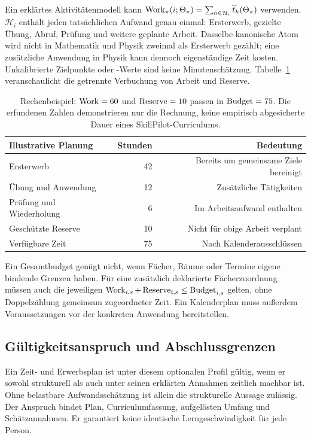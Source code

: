 Ein erklärtes Aktivitätenmodell kann
$\operatorname{Work}_\pi(i;\Theta_\pi)=\sum_{h\in\mathcal H_i}\widehat t_h(\Theta_\pi)$
verwenden. $\mathcal H_i$ enthält jeden tatsächlichen Aufwand genau einmal:
Ersterwerb, gezielte Übung, Abruf, Prüfung und weitere geplante Arbeit.
Dasselbe kanonische Atom wird nicht in Mathematik und Physik zweimal als
Ersterwerb gezählt; eine zusätzliche Anwendung in Physik kann dennoch
eigenständige Zeit kosten. Unkalibrierte \glqq Zielpunkte\grqq{} oder
-Werte sind keine Minutenschätzung.
Tabelle~\ref{tab:workload} veranschaulicht die getrennte Verbuchung von
Arbeit und Reserve.

\begin{table}[htbp]
\centering
\begin{tabular}{@{}lrr@{}}
\toprule
Illustrative Planung & Stunden & Bedeutung\\
\midrule
Ersterwerb & 42 & Bereits um gemeinsame Ziele bereinigt\\
Übung und Anwendung & 12 & Zusätzliche Tätigkeiten\\
Prüfung und Wiederholung & 6 & Im Arbeitsaufwand enthalten\\
Geschützte Reserve & 10 & Nicht für obige Arbeit verplant\\
Verfügbare Zeit & 75 & Nach Kalenderausschlüssen\\
\bottomrule
\end{tabular}
\caption{Rechenbeispiel: $\operatorname{Work}=60$ und $\operatorname{Reserve}=10$ passen in
$\operatorname{Budget}=75$. Die erfundenen Zahlen demonstrieren nur die Rechnung,
keine empirisch abgesicherte Dauer eines SkillPilot-Curriculums.}
\label{tab:workload}
\end{table}

Ein Gesamtbudget genügt nicht, wenn Fächer, Räume oder Termine eigene
bindende Grenzen haben. Für eine zusätzlich deklarierte Fächerzuordnung
müssen auch die jeweiligen $\operatorname{Work}_{i,s}+\operatorname{Reserve}_{i,s}\leq \operatorname{Budget}_{i,s}$
gelten, ohne Doppelzählung gemeinsam zugeordneter Zeit. Ein Kalenderplan
muss außerdem Voraussetzungen vor der konkreten Anwendung bereitstellen.

\subsection{Gültigkeitsanspruch und Abschlussgrenzen}
Ein Zeit- und Erwerbsplan ist unter diesem optionalen Profil gültig, wenn
er sowohl strukturell als auch unter seinen erklärten Annahmen zeitlich
machbar ist.
Ohne belastbare Aufwandsschätzung ist allein die strukturelle Aussage
zulässig. Der Anspruch bindet Plan, Curriculumfassung, aufgelösten Umfang
und Schätzannahmen. Er garantiert keine identische Lerngeschwindigkeit
für jede Person.

